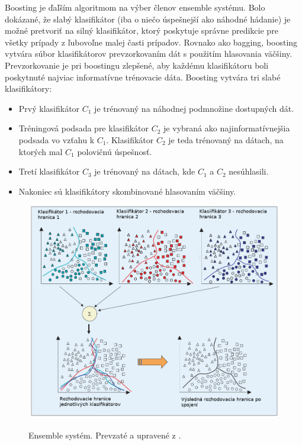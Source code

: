 Boosting \cite{boosting} je ďaľším algoritmom na výber členov ensemble systému. Bolo dokázané, že slabý klasifikátor (iba o niečo úspešnejší ako náhodné hádanie) je možné pretvoriť na silný klasifikátor, ktorý poskytuje správne predikcie pre všetky prípady z ľubovoľne malej časti prípadov. Rovnako ako bagging, boosting vytvára súbor klasifikátorov prevzorkovaním dát s použitím hlasovania väčšiny. Prevzorkovanie je pri boostingu zlepšené, aby každému klasifikátoru boli poskytnuté najviac informatívne trénovacie dáta. Boosting vytvára tri slabé klasifikátory:
\begin{itemize}
	\item Prvý klasifikátor $C_{1}$ je trénovaný na náhodnej podmnožine dostupných dát.
	\item Tréningová podsada pre klasifikátor $C_{2}$ je vybraná ako najinformatívnejšia podsada vo vzťahu k $C_{1}$. Klasifikátor $C_{2}$ je teda trénovaný na dátach, na ktorých mal $C_{1}$ polovičnú úspešnosť. 
	\item Tretí klasifikátor $C_{3}$ je trénovaný na dátach, kde $C_{1}$ a $C_{2}$ nesúhlasili.
	\item Nakoniec sú klasifikátory skombinované hlasovaním väčšiny.
\end{itemize}

\begin{figure}[H]
	\centering
	\begin{center}
		\scalebox{0.4}
		{   
			\includegraphics{ensemble.png}
		}
		\caption[ensemble]{Ensemble systém. Prevzaté a upravené z \cite{polikar}.}
		\label{ensemble}	
\end{center}
\end{figure}

